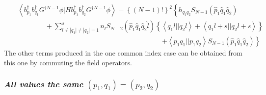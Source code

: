 \begin{eqnarray}
&&\left\langle b_{p_{1}}^{\dagger }b_{q_{1}}^{\dagger }G^{\dagger N-1}\phi
|Hb_{p_{1}}^{\dagger }b_{q_{2}}^{\dagger }G^{\dagger N-1}\phi \right\rangle
=\left\{ \left( N-1\right) !\right\} ^{2}\left\{ h_{q_{1}q_{2}}S_{N-1}\left( 
\hat{p}_{1}\hat{q}_{1}\hat{q}_{2}\right) \right.  \nonumber \\
&&\left. {}\right. \qquad \qquad +\sum_{l\neq \left| q_{1}\right| \neq
\left| q_{2}\right| =1}^{s}n_{l}S_{N-2}\left( \hat{p}_{1}\hat{q}_{1}\hat{q}%
_{2}\hat{l}\right) \left\{ \left\langle q_{1}l||q_{2}l\right\rangle
+\left\langle q_{1}l+s||q_{2}l+s\right\rangle \right\}  \nonumber \\
&&\qquad \qquad \qquad \qquad \qquad \qquad \qquad \qquad \qquad \qquad
\quad \left. +\left\langle p_{1}q_{1}||p_{1}q_{2}\right\rangle S_{N-1}\left( 
\hat{p}_{1}\hat{q}_{1}\hat{q}_{2}\right) \right\}
\end{eqnarray}%
The other terms produced in the one common index case can be obtained from
this one by commuting the field operators.

\subsubsection{{\it All values the same }$\left( p_{1},q_{1}\right) =\left(
p_{2},q_{2}\right) $}

